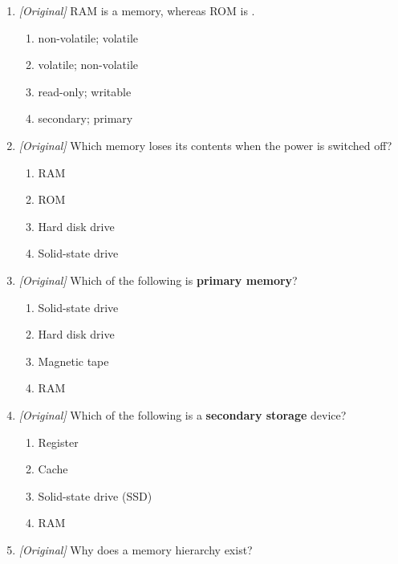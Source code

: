 \documentclass[11pt]{article}
\begin{document}
\begin{enumerate}[label=\textbf{Q\arabic*.}, leftmargin=*]
\begin{enumerate}[label=\Alph*.]
    \item It stores recently and frequently used data.
    \item It helps exploit locality of reference.
    \item It acts as a permanent backup for the contents of RAM.
    \item It is faster than main memory.
  \end{enumerate}
\item \textit{[Original]} RAM is a \underline{\hspace{2.2cm}} memory, whereas
  ROM is \underline{\hspace{2.2cm}}.
  \begin{enumerate}[label=\Alph*.]
    \item non-volatile; volatile
    \item volatile; non-volatile
    \item read-only; writable
    \item secondary; primary
  \end{enumerate}
\item \textit{[Original]} Which memory loses its contents when the power is
  switched off?
  \begin{enumerate}[label=\Alph*.]
    \item RAM
    \item ROM
    \item Hard disk drive
    \item Solid-state drive
  \end{enumerate}
\item \textit{[Original]} Which of the following is \textbf{primary memory}?
  \begin{enumerate}[label=\Alph*.]
    \item Solid-state drive
    \item Hard disk drive
    \item Magnetic tape
    \item RAM
  \end{enumerate}
\item \textit{[Original]} Which of the following is a \textbf{secondary
  storage} device?
  \begin{enumerate}[label=\Alph*.]
    \item Register
    \item Cache
    \item Solid-state drive (SSD)
    \item RAM
  \end{enumerate}
\item \textit{[Original]} Why does a memory hierarchy exist?

\end{enumerate}
\end{document}
